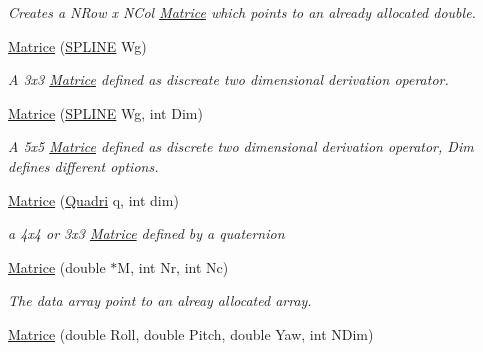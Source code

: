 \begin{DoxyCompactItemize}
\begin{DoxyCompactList}\small\item\em \-Creates a \-N\-Row x \-N\-Col \hyperlink{classMatrice}{\-Matrice} which points to an already allocated double. \end{DoxyCompactList}\item 
\hypertarget{classMatrice_a7f7c9cd8e95dbf5128eae712964b8acb}{\hyperlink{classMatrice_a7f7c9cd8e95dbf5128eae712964b8acb}{\-Matrice} (\hyperlink{structSPLINE}{\-S\-P\-L\-I\-N\-E} \-Wg)}\label{classMatrice_a7f7c9cd8e95dbf5128eae712964b8acb}

\begin{DoxyCompactList}\small\item\em \-A 3x3 \hyperlink{classMatrice}{\-Matrice} defined as discreate two dimensional derivation operator. \end{DoxyCompactList}\item 
\hypertarget{classMatrice_aaffb4cf7d6170d962a39afb0d30ae9cf}{\hyperlink{classMatrice_aaffb4cf7d6170d962a39afb0d30ae9cf}{\-Matrice} (\hyperlink{structSPLINE}{\-S\-P\-L\-I\-N\-E} \-Wg, int \-Dim)}\label{classMatrice_aaffb4cf7d6170d962a39afb0d30ae9cf}

\begin{DoxyCompactList}\small\item\em \-A 5x5 \hyperlink{classMatrice}{\-Matrice} defined as discrete two dimensional derivation operator, \-Dim defines different options. \end{DoxyCompactList}\item 
\hyperlink{classMatrice_aeb402ee1c3e83c9b7962e8f881c5d19f}{\-Matrice} (\hyperlink{classQuadri}{\-Quadri} q, int dim)
\begin{DoxyCompactList}\small\item\em a 4x4 or 3x3 \hyperlink{classMatrice}{\-Matrice} defined by a quaternion \end{DoxyCompactList}\item 
\hypertarget{classMatrice_a9d38a3b33a31d20d70fa1c87fa70319d}{\hyperlink{classMatrice_a9d38a3b33a31d20d70fa1c87fa70319d}{\-Matrice} (double $\ast$\-M, int \-Nr, int \-Nc)}\label{classMatrice_a9d38a3b33a31d20d70fa1c87fa70319d}

\begin{DoxyCompactList}\small\item\em \-The data array point to an alreay allocated array. \end{DoxyCompactList}\item 
\hypertarget{classMatrice_a0ef7999ffc3ba03dc67e3233b4465b85}{\hyperlink{classMatrice_a0ef7999ffc3ba03dc67e3233b4465b85}{\-Matrice} (double \-Roll, double \-Pitch, double \-Yaw, int \-N\-Dim)}\label{classMatrice_a0ef7999ffc3ba03dc67e3233b4465b85}


\end{DoxyCompactItemize}
